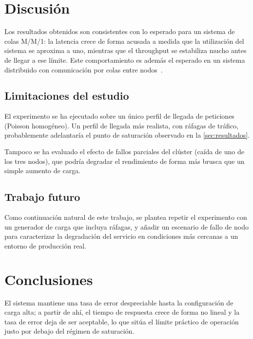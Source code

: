 \documentclass[11pt,twoside]{article}
\begin{document}
\section{Discusión}
\label{sec:discusion}

Los resultados obtenidos son consistentes con lo esperado para un sistema
de colas M/M/1: la latencia crece de forma acusada a medida que la
utilización del sistema se aproxima a uno, mientras que el throughput se
estabiliza mucho antes de llegar a ese límite. Este comportamiento es
además el esperado en un sistema distribuido con comunicación por colas
entre nodos~\cite{tanenbaum2007}.

\subsection{Limitaciones del estudio}

El experimento se ha ejecutado sobre un único perfil de llegada de
peticiones (Poisson homogéneo). Un perfil de llegada más realista, con
ráfagas de tráfico, probablemente adelantaría el punto de saturación
observado en la \autoref{sec:resultados}.

Tampoco se ha evaluado el efecto de fallos parciales del clúster (caída de
uno de los tres nodos), que podría degradar el rendimiento de forma más
brusca que un simple aumento de carga.

\subsection{Trabajo futuro}

Como continuación natural de este trabajo, se plantea repetir el
experimento con un generador de carga que incluya ráfagas, y añadir un
escenario de fallo de nodo para caracterizar la degradación del servicio
en condiciones más cercanas a un entorno de producción real.

\section{Conclusiones}
\label{sec:conclusiones}

El sistema mantiene una tasa de error despreciable hasta la configuración
de carga alta; a partir de ahí, el tiempo de respuesta crece de forma no
lineal y la tasa de error deja de ser aceptable, lo que sitúa el límite
práctico de operación justo por debajo del régimen de saturación.



\end{document}
